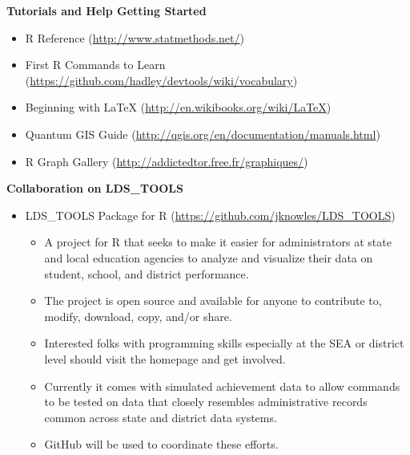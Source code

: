 \documentclass{article}
\begin{document}
\vspace{.15in}

\textbf{Tutorials and Help Getting Started}

\begin{itemize}
  \item R Reference (\href{http://www.statmethods.net/}{http://www.statmethods.net/})
  \item First R Commands to Learn (\href{https://github.com/hadley/devtools/wiki/vocabulary}{https://github.com/hadley/devtools/wiki/vocabulary})
  \item Beginning with \LaTeX{} (\href{http://en.wikibooks.org/wiki/LaTeX}{http://en.wikibooks.org/wiki/LaTeX})
  \item Quantum GIS Guide (\href{http://qgis.org/en/documentation/manuals.html}{http://qgis.org/en/documentation/manuals.html})
  \item R Graph Gallery (\href{http://addictedtor.free.fr/graphiques/}{http://addictedtor.free.fr/graphiques/})

\end{itemize}

\vspace{.15in}

\textbf{Collaboration on LDS\_TOOLS}

\begin{itemize}
  \item \textsc{LDS\_TOOLS} Package for R (\href{https://github.com/jknowles/LDS_TOOLS}{https://github.com/jknowles/LDS\_TOOLS})
    \begin{itemize}
    \item  A project for R that seeks to make it easier for administrators at state and local education agencies to analyze and visualize their data on student, school, and district performance.
    \item  The project is open source and available for anyone to contribute to, modify, download, copy, and/or share. 
    \item  Interested folks with programming skills especially at the \textsc{SEA} or district level should visit the homepage and get involved.
    \item  Currently it comes with simulated achievement data to allow commands to be tested on data that closely resembles administrative records common across state and district data systems.
    \item GitHub will be used to coordinate these efforts. 
    \end{itemize}

\end{itemize}
\end{document}
